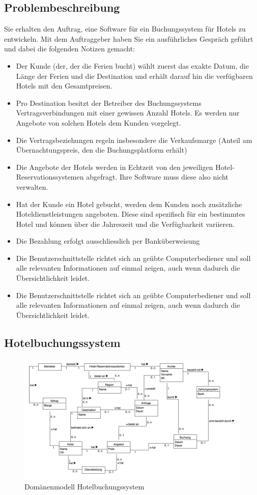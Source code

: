 \documentclass[11pt,ngerman]{article}
\begin{document}
    \subsection{Problembeschreibung}
    Sie erhalten den Auftrag, eine Software für ein Buchungssystem für Hotels zu entwickeln. Mit dem Auftraggeber haben Sie ein ausführliches Gespräch geführt und dabei die folgenden Notizen gemacht:\\
    \begin{itemize}
        \item Der Kunde (der, der die Ferien bucht) wählt zuerst das exakte Datum, die Länge der Ferien und die Destination und erhält darauf hin die verfügbaren Hotels mit den Gesamtpreisen.
        \item Pro Destination besitzt der Betreiber des Buchungssystems Vertragsverbindungen mit einer gewissen Anzahl Hotels. Es werden nur Angebote von solchen Hotels dem Kunden vorgelegt.
        \item Die Vertragsbeziehungen regeln insbesondere die Verkaufsmarge (Anteil am Übernachtungspreis, den die Buchungsplatform erhält)
        \item Die Angebote der Hotels werden in Echtzeit von den jeweiligen Hotel-Reservationssystemen abgefragt. Ihre Software muss diese also nicht verwalten.
        \item Hat der Kunde ein Hotel gebucht, werden dem Kunden noch zusätzliche Hoteldienstleistungen angeboten. Diese sind spezifisch für ein bestimmtes Hotel und können über die Jahreszeit und die Verfügbarkeit variieren.
        \item Die Bezahlung erfolgt ausschliesslich per Banküberweisung
        \item Die Benutzerschnittstelle richtet sich an geübte Computerbediener und soll alle relevanten
        Informationen auf einmal zeigen, auch wenn dadurch die Übersichtlichkeit leidet.
        \item Die Benutzerschnittstelle richtet sich an geübte Computerbediener und soll alle relevanten
        Informationen auf einmal zeigen, auch wenn dadurch die Übersichtlichkeit leidet.
    \end{itemize}
    \clearpage

    \subsection{Hotelbuchungssystem}

    \begin{figure}[H]
        \includegraphics[scale=0.50]{HotelBuchungsSystem.png}
        \caption{Domänenmodell Hotelbuchungssystem}
    \end{figure}
\end{document}
